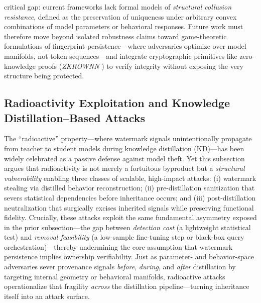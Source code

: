 \documentclass[11pt,a4paper]{article}
\begin{document}
critical gap: current frameworks lack formal models of \emph{structural collusion resistance}, defined as the preservation of uniqueness under arbitrary convex combinations of model parameters or behavioral responses. Future work must therefore move beyond isolated robustness claims toward game-theoretic formulations of fingerprint persistence---where adversaries optimize over model manifolds, not token sequences---and integrate cryptographic primitives like zero-knowledge proofs (\emph{ZKROWNN} \cite{doi:10.1109/dac56929.2023.10247798}) to verify integrity without exposing the very structure being protected.


\subsection{Radioactivity Exploitation and Knowledge Distillation--Based Attacks}


The ``radioactive'' property---where watermark signals unintentionally propagate from teacher to student models during knowledge distillation (KD)---has been widely celebrated as a passive defense against model theft. Yet this subsection argues that radioactivity is not merely a fortuitous byproduct but a \emph{structural vulnerability} enabling three classes of scalable, high-impact attacks: (i) watermark stealing via distilled behavior reconstruction; (ii) pre-distillation sanitization that severs statistical dependencies before inheritance occurs; and (iii) post-distillation neutralization that surgically excises inherited signals while preserving functional fidelity. Crucially, these attacks exploit the same fundamental asymmetry exposed in the prior subsection---the gap between \emph{detection cost} (a lightweight statistical test) and \emph{removal feasibility} (a low-sample fine-tuning step or black-box query orchestration)---thereby undermining the core assumption that watermark persistence implies ownership verifiability. Just as parameter- and behavior-space adversaries sever provenance signals \emph{before}, \emph{during}, and \emph{after} distillation by targeting internal geometry or behavioral manifolds, radioactive attacks operationalize that fragility \emph{across} the distillation pipeline---turning inheritance itself into an attack surface.
\end{document}
